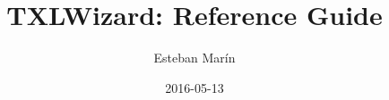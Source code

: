 \documentclass[12pt,a4paper]{article}
\begin{document}
\title{TXLWizard: Reference Guide}
\author{Esteban Marín}
\date{2016-05-13}
\maketitle


\newpage
\tableofcontents
\pagestyle{headings}

\newpage








\end{document}

